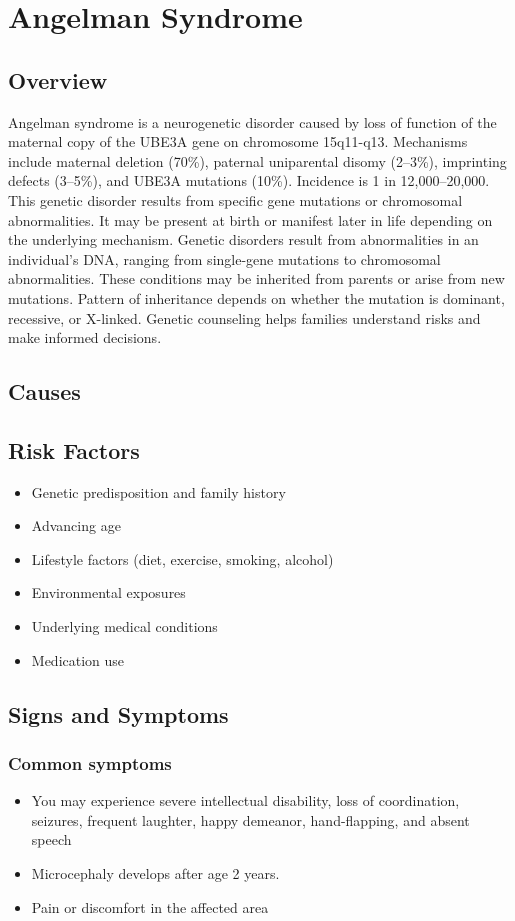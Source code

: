 \chapter{Angelman Syndrome}
\label{sec:Angelman Syndrome}

\section{Overview}
Angelman syndrome is a neurogenetic disorder caused by loss of function of the maternal copy of the UBE3A gene on chromosome 15q11-q13. Mechanisms include maternal deletion (70\%), paternal uniparental disomy (2--3\%), imprinting defects (3--5\%), and UBE3A mutations (10\%). Incidence is 1 in 12,000--20,000. This genetic disorder results from specific gene mutations or chromosomal abnormalities. It may be present at birth or manifest later in life depending on the underlying mechanism. Genetic disorders result from abnormalities in an individual's DNA, ranging from single-gene mutations to chromosomal abnormalities. These conditions may be inherited from parents or arise from new mutations. Pattern of inheritance depends on whether the mutation is dominant, recessive, or X-linked. Genetic counseling helps families understand risks and make informed decisions.
\section{Causes}
\section{Risk Factors}

\begin{itemize}[noitemsep]
  \item Genetic predisposition and family history
  \item Advancing age
  \item Lifestyle factors (diet, exercise, smoking, alcohol)
  \item Environmental exposures
  \item Underlying medical conditions
  \item Medication use
\end{itemize}
\section{Signs and Symptoms}

\subsection{Common symptoms}
\begin{itemize}[noitemsep]
  \item You may experience severe intellectual disability, loss of coordination, seizures, frequent laughter, happy demeanor, hand-flapping, and absent speech
  \item Microcephaly develops after age 2 years.
  \item Pain or discomfort in the affected area
  \end{itemize}

